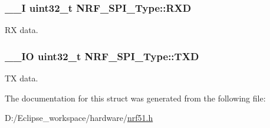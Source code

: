 \subsubsection[{R\+X\+D}]{\setlength{\rightskip}{0pt plus 5cm}\+\_\+\+\_\+\+I uint32\+\_\+t N\+R\+F\+\_\+\+S\+P\+I\+\_\+\+Type\+::\+R\+X\+D}\label{struct_n_r_f___s_p_i___type_ab4b135ec077f4588b01a99089377e5d4}
R\+X data. \hypertarget{struct_n_r_f___s_p_i___type_abbdfd2eafab6da6953a94d309a1064e3}{}
\subsubsection[{T\+X\+D}]{\setlength{\rightskip}{0pt plus 5cm}\+\_\+\+\_\+\+I\+O uint32\+\_\+t N\+R\+F\+\_\+\+S\+P\+I\+\_\+\+Type\+::\+T\+X\+D}\label{struct_n_r_f___s_p_i___type_abbdfd2eafab6da6953a94d309a1064e3}
T\+X data. 

The documentation for this struct was generated from the following file\+:\begin{DoxyCompactItemize}
\item 
D\+:/\+Eclipse\+\_\+workspace/hardware/\hyperlink{nrf51_8h}{nrf51.\+h}\end{DoxyCompactItemize}
